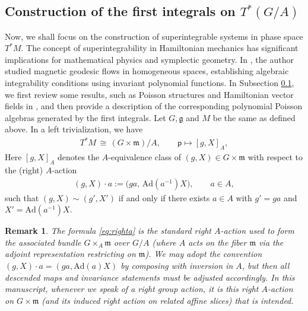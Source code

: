 \documentclass[11pt]{amsart}
\theoremstyle{definition}
\theoremstyle{plain}
\newtheorem{remark}[theorem]{Remark}
\theoremstyle{conclusion}
\begin{document}
\subsection{Construction of the first integrals on \texorpdfstring{$T^*(G/A)$}{T*(G/A)}}
\label{subsec:confirst}
Now, we shall focus on the construction of superintegrable systems in phase space $T^*M$. The concept of superintegrability in Hamiltonian mechanics has significant implications for mathematical physics and symplectic geometry. In \cite{MR2141306}, the author studied magnetic geodesic flows in homogeneous spaces, establishing algebraic integrability conditions using invariant polynomial functions. In Subsection \ref{subsec:confirst}, we first review some results, such as Poisson structures and Hamiltonian vector fields in \cite{MR2141306}, and then provide a description of the corresponding polynomial Poisson algebras generated by the first integrals.  %
Let $G,\mathfrak{g}$ and $M$ be the same as defined above.  In a left trivialization, we have \begin{align}
   T^*M \,\cong\, \left(G\times \mathfrak{m}\right)/A,\qquad \mathsf{p} \longmapsto [g,X]_A,  \label{eq:lefttran} 
\end{align} Here $[g,X]_A$ denotes the $A$-equivalence class of $(g,X)\in G\times \mathfrak{m}$ with respect to the (right) $A$-action \begin{align}
(g,X)\cdot a := \bigl(ga,\,\mathrm{Ad}(a^{-1})X\bigr),\qquad a\in A, \label{eq:righta}
\end{align} such that $(g,X)\sim (g',X')$ if and only if there exists $a\in A$ with $g'=ga$ and $X'=\mathrm{Ad}(a^{-1})X$.

\begin{remark}
\label{rmk:rightAaction}
The formula \eqref{eq:righta} is the standard right $A$-action used to form the associated bundle $G\times_A\mathfrak{m}$ over $G/A$ (where $A$ acts on the fiber $\mathfrak{m}$ via the adjoint representation restricting on $\mathfrak{m}$). We may adopt the convention $(g,X) \cdot a= (ga,\mathrm{Ad}(a)X)$ by composing with inversion in $A$, but then all descended maps and invariance statements must be adjusted accordingly. In this manuscript, whenever we speak of a \emph{right} group action, it is this right $A$-action on $G\times\mathfrak{m}$ (and its induced right action on related affine slices) that is intended.
\end{remark}
\end{document}
